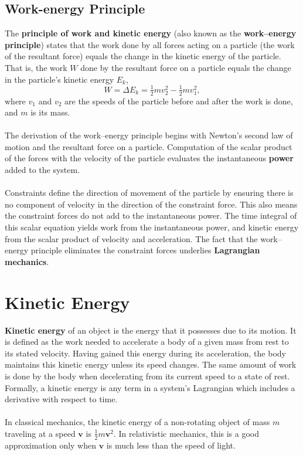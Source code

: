 \subsection{Work-energy Principle}
The \textbf{principle of work and kinetic energy} (also known as the \textbf{work–energy principle}) states that the work done by all forces acting on a particle (the work of the resultant force) equals the change in the kinetic energy of the particle. That is, the work $W$ done by the resultant force on a particle equals the change in the particle's kinetic energy $E_k$,
\[
W = \Delta E_k = \tfrac{1}{2}mv_2^2 - \tfrac{1}{2}mv_1^2 ,
\]
where $v_1$ and $v_2$ are the speeds of the particle before and after the work is done, and $m$ is its mass.
\\\\
The derivation of the work–energy principle begins with Newton’s second law of motion and the resultant force on a particle. Computation of the scalar product of the forces with the velocity of the particle evaluates the instantaneous \textbf{power} added to the system.
\\\\
Constraints define the direction of movement of the particle by ensuring there is no component of velocity in the direction of the constraint force. This also means the constraint forces do not add to the instantaneous power. The time integral of this scalar equation yields work from the instantaneous power, and kinetic energy from the scalar product of velocity and acceleration. The fact that the work–energy principle eliminates the constraint forces underlies \textbf{Lagrangian mechanics}.

\section{Kinetic Energy}
\textbf{Kinetic energy} of an object is the energy that it possesses due to its motion. It is defined as the work needed to accelerate a body of a given mass from rest to its stated velocity. Having gained this energy during its acceleration, the body maintains this kinetic energy unless its speed changes. The same amount of work is done by the body when decelerating from its current speed to a state of rest. Formally, a kinetic energy is any term in a system's Lagrangian which includes a derivative with respect to time.
\\\\
In classical mechanics, the kinetic energy of a non-rotating object of mass $m$ traveling at a speed $\mathbf{v}$ is $\frac{1}{2}m\mathbf{v}^2$. In relativistic mechanics, this is a good approximation only when $\textbf{v}$ is much less than the speed of light.

